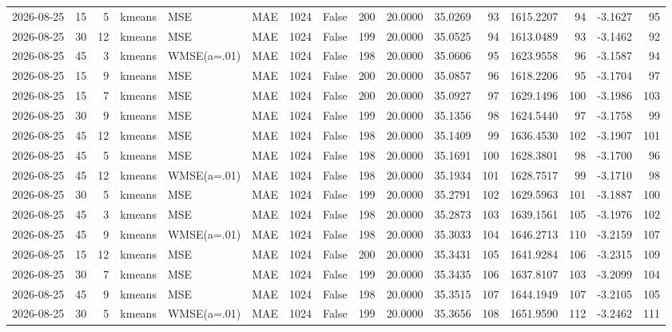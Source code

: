 \documentclass[10pt]{article}
\begin{document}
\begin{landscape}
\begin{longtable}{@{}lrrlllrcrrrrrrrr@{}}
2026-08-25 & 15 & 5 & kmeans & MSE & MAE & 1024 & False & 200 & 20.0000 & 35.0269 & 93 & 1615.2207 & 94 & -3.1627 & 95 \\
2026-08-25 & 30 & 12 & kmeans & MSE & MAE & 1024 & False & 199 & 20.0000 & 35.0525 & 94 & 1613.0489 & 93 & -3.1462 & 92 \\
2026-08-25 & 45 & 3 & kmeans & WMSE(a=.01) & MAE & 1024 & False & 198 & 20.0000 & 35.0606 & 95 & 1623.9558 & 96 & -3.1587 & 94 \\
2026-08-25 & 15 & 9 & kmeans & MSE & MAE & 1024 & False & 200 & 20.0000 & 35.0857 & 96 & 1618.2206 & 95 & -3.1704 & 97 \\
2026-08-25 & 15 & 7 & kmeans & MSE & MAE & 1024 & False & 200 & 20.0000 & 35.0927 & 97 & 1629.1496 & 100 & -3.1986 & 103 \\
2026-08-25 & 30 & 9 & kmeans & MSE & MAE & 1024 & False & 199 & 20.0000 & 35.1356 & 98 & 1624.5440 & 97 & -3.1758 & 99 \\
2026-08-25 & 45 & 12 & kmeans & MSE & MAE & 1024 & False & 198 & 20.0000 & 35.1409 & 99 & 1636.4530 & 102 & -3.1907 & 101 \\
2026-08-25 & 45 & 5 & kmeans & MSE & MAE & 1024 & False & 198 & 20.0000 & 35.1691 & 100 & 1628.3801 & 98 & -3.1700 & 96 \\
2026-08-25 & 45 & 12 & kmeans & WMSE(a=.01) & MAE & 1024 & False & 198 & 20.0000 & 35.1934 & 101 & 1628.7517 & 99 & -3.1710 & 98 \\
2026-08-25 & 30 & 5 & kmeans & MSE & MAE & 1024 & False & 199 & 20.0000 & 35.2791 & 102 & 1629.5963 & 101 & -3.1887 & 100 \\
2026-08-25 & 45 & 3 & kmeans & MSE & MAE & 1024 & False & 198 & 20.0000 & 35.2873 & 103 & 1639.1561 & 105 & -3.1976 & 102 \\
2026-08-25 & 45 & 9 & kmeans & WMSE(a=.01) & MAE & 1024 & False & 198 & 20.0000 & 35.3033 & 104 & 1646.2713 & 110 & -3.2159 & 107 \\
2026-08-25 & 15 & 12 & kmeans & MSE & MAE & 1024 & False & 200 & 20.0000 & 35.3431 & 105 & 1641.9284 & 106 & -3.2315 & 109 \\
2026-08-25 & 30 & 7 & kmeans & MSE & MAE & 1024 & False & 199 & 20.0000 & 35.3435 & 106 & 1637.8107 & 103 & -3.2099 & 104 \\
2026-08-25 & 45 & 9 & kmeans & MSE & MAE & 1024 & False & 198 & 20.0000 & 35.3515 & 107 & 1644.1949 & 107 & -3.2105 & 105 \\
2026-08-25 & 30 & 5 & kmeans & WMSE(a=.01) & MAE & 1024 & False & 199 & 20.0000 & 35.3656 & 108 & 1651.9590 & 112 & -3.2462 & 111 \\

\end{longtable}
\end{landscape}
\end{document}
